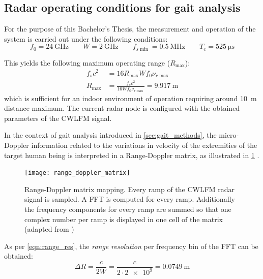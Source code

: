 \subsection{Radar operating conditions for gait analysis} \label{sec:radar_operating_conditions}

For the purpose of this Bachelor's Thesis, the measurement and operation of the system is carried out under the following conditions:
\begin{equation} \label{eq:if_conditions}
	f_0 = \SI{24}{\giga\hertz} \qquad W = \SI{2}{\giga\hertz} \qquad f_{s\min} = \SI{0.5}{\mega\hertz} \qquad T_c = \SI{525}{\micro\second}
\end{equation}

This yields the following maximum operating range ($R_{\max}$):
\begin{align}
	f_s c^2 &= 16 R_{\max}W f_0 \nu_{r\max} \\
	R_{\max} &= \frac{f_s c^2}{16 W f_0 \nu_{r\max}} = \SI{9.917}{\meter}
\end{align}
which is sufficient for an indoor environment of operation requiring around \SI{10}{\meter} distance maximum. The current radar node is configured with the obtained parameters of the CWLFM signal.

In the context of gait analysis introduced in \cref{sec:gait_methods}, the micro-Doppler information related to the variations in velocity of the extremities of the target human being is interpreted in a Range-Doppler matrix, as illustrated in \cref{fig:range_doppler_matrix} \cite{Amin2017,Richards2010,Senigagliesi2020}.

\begin{figure}[ht]
	\centering
	\texttt{[image: range\_doppler\_matrix]}
	\caption[Range-Doppler matrix mapping. Each ramp of the CWLFM radar signal is sampled. A FFT is computed for every ramp. Additionally the frequency components for every ramp are summed so that one complex number per ramp is displayed in one cell of the matrix]{Range-Doppler matrix mapping. Every ramp of the CWLFM radar signal is sampled. A FFT is computed for every ramp. Additionally the frequency components for every ramp are summed so that one complex number per ramp is displayed in one cell of the matrix  (adapted from \cite{Senigagliesi2020})}
	\label{fig:range_doppler_matrix}
\end{figure}

As per \cref{eqn:range_res}, the \textit{range resolution} per frequency bin of the FFT can be obtained:
\begin{equation} \label{eqn:range_res_ours}
	\Delta R = \frac{c}{2W} = \frac{c}{2 \cdot \num{2e9}} = \SI{0.0749}{\metre}
\end{equation}


